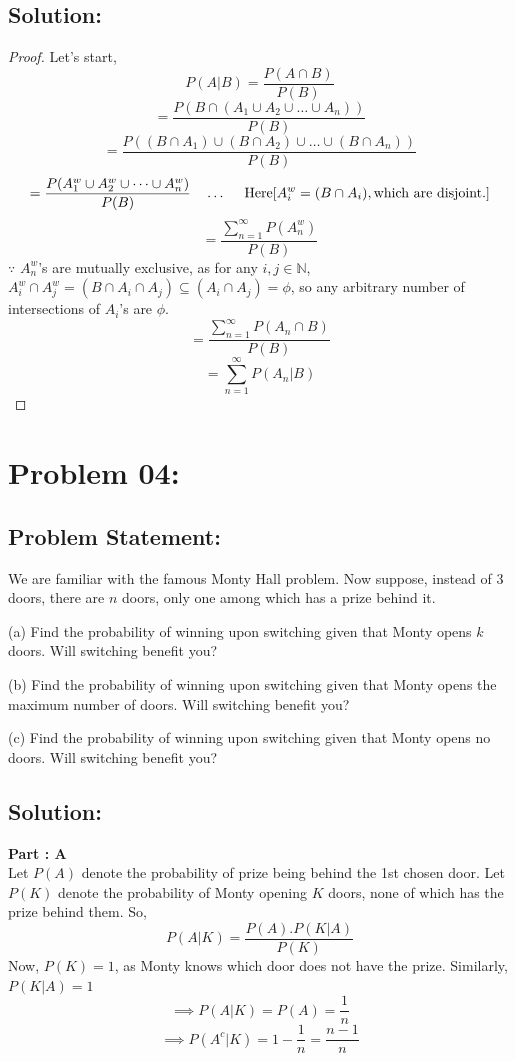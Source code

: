 \documentclass{article}
\theoremstyle{definition}
\begin{document}
\subsection{Solution:}

\begin{proof}
  
    Let's start,
    \[
    P(A|B) = \frac{P(A \cap B)}{P(B)}
    \]
    \[
    = \frac{P(B \cap (A_1 \cup A_2 \cup \dots \cup A_n))}{P(B)}
    \]
    \[
    = \frac{P((B \cap A_1) \cup ( B \cap A_2) \cup \dots \cup (B \cap  A_n))}{P(B)}
    \]
    \[
    = \frac{P(A_1^w \cup A_2^w \cup \dots \cup A_n^w)}{P(B)} \quad \dots \text{ \quad Here} [A_i^w = (B \cap A_i), \text{which are disjoint.}]
    \]
    \[
    = \frac{\sum_{n=1}^{\infty} P(A_n^w)}{P(B)}
    \]
    $\because$ $A_n^w$'s are mutually exclusive, as for any $i,j \in \mathbb N$, $A_i^w \cap A_j^w = (B \cap A_i \cap A_j) \subseteq ( A_i \cap A_j) = \phi$, so any arbitrary number of intersections of $A_i$'s are $\phi$.
    \[
       = \frac{\sum_{n=1}^{\infty} P(A_n \cap B)}{P(B)}
    \]
\[
   = \sum_{n=1}^{\infty} P(A_n | B)
\]

\end{proof}

\section{Problem 04:}
\begin{mdframed}[style = MyFrame]
    \subsection{Problem Statement:}
    We are familiar with the famous Monty Hall problem. Now suppose, instead of 3 doors, there are $n$ doors, only one among which has a prize behind it.

(a) Find the probability of winning upon switching given that Monty opens $k$ doors. Will switching benefit you?

(b) Find the probability of winning upon switching given that Monty opens the maximum number of doors. Will switching benefit you?

(c) Find the probability of winning upon switching given that Monty opens no doors. Will switching benefit you?
\end{mdframed}
\subsection{Solution:}
\textbf{Part : A}\\
Let $P(A)$ denote the probability of prize being behind the 1st chosen door. Let $P(K)$ denote the probability of Monty opening $K$ doors, none of which has the prize behind them. So,
\[
P(A|K) = \frac{P(A).P(K|A)}{P(K)}
\]
Now, $P(K) =1$, as Monty knows which door does not have the prize. Similarly, $P(K|A) =1$
\[
\implies P(A|K) = P(A) = \frac{1}{n}
\]
\[
\implies P(A^c|K) = 1 - \frac{1}{n} = \frac{n-1}{n}
\]
\end{document}
